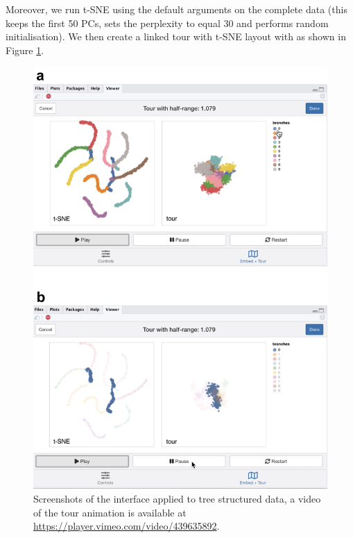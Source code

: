 \documentclass[article,notitle]{jdssv}
\begin{document}
Moreover, we run t-SNE using the default arguments on the complete data (this
keeps the first 50 PCs, sets the perplexity to equal 30 and performs random
initialisation). We then create a linked
tour with t-SNE layout with  as shown in Figure \ref{fig:trees-01}.



\begin{figure}

{\centering \includegraphics[width=\textwidth,height=0.75\textheight]{./img/liminal-screenshot-trees-01} 

}

\caption{Screenshots of the  interface applied to tree structured data, a video of the tour animation is available at \url{https://player.vimeo.com/video/439635892}.}\label{fig:trees-01}
\end{figure}
\end{document}
